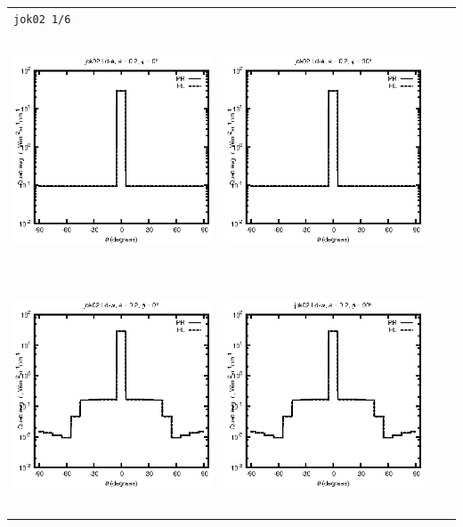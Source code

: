 \documentclass[10pt,a4paper]{article}
\begin{document}
\begin{adjustwidth}{-1.2in}{-1.2in}
\begin{tabular}{c c c c}
\multicolumn{4}{l}{\texttt{jok02 1/6}} \\
\includegraphics[height=7cm]{../eps/jok02_Ld_a_fwd.eps} &
\includegraphics[height=7cm]{../eps/jok02_Ld_a_cross.eps}\\
\includegraphics[height=7cm]{../eps/jok02_Ld_w_fwd.eps} &
\includegraphics[height=7cm]{../eps/jok02_Ld_w_cross.eps} \\

\end{tabular}
\end{adjustwidth}
\end{document}
